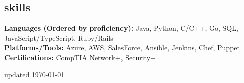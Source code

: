 \documentclass[margin,10pt]{res}
\begin{document}
\begin{resume}
\section{\sc \lsstyle skills}
    \textbf{Languages (Ordered by proficiency):}
    Java, Python, C/C++, Go, SQL, JavaScript/TypeScript, Ruby/Rails  \\
    \textbf{Platforms/Tools:} Azure, AWS, SalesForce, Ansible, Jenkins, Chef, Puppet\\
    \textbf{Certifications:} CompTIA Network+, Security+\\
\end{resume}
\begin{minipage}[t]{\textwidth}
    \flushright
    \small
    \sc \lsstyle
    \hfill updated \today
\end{minipage}
\end{document}
